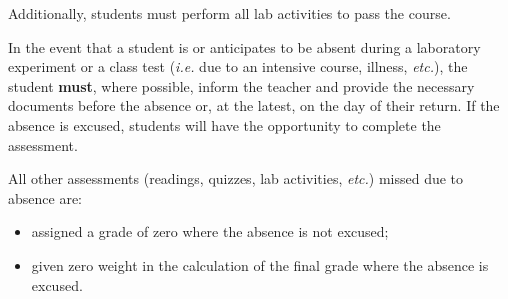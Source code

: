\entry{\mbox{ }}
{Additionally, students must perform all lab activities to pass the course.

\smallskip
In the event that a student is or anticipates to be absent during a laboratory experiment or a class test (\textit{i.e.} due to an intensive course, illness, \textit{etc.}), the student \textbf{must}, where possible, inform the teacher and provide the necessary documents before the absence or, at the latest, on the day of their return.  If the absence is excused, students will have the opportunity to complete the assessment.
\smallskip

All other assessments (readings, quizzes, lab activities, \textit{etc.}) missed due to absence are:
\begin{itemize}
	\item assigned a grade of zero where the absence is not excused;
	\item given zero weight in the calculation of the final grade where the absence is excused.
\end{itemize}
}